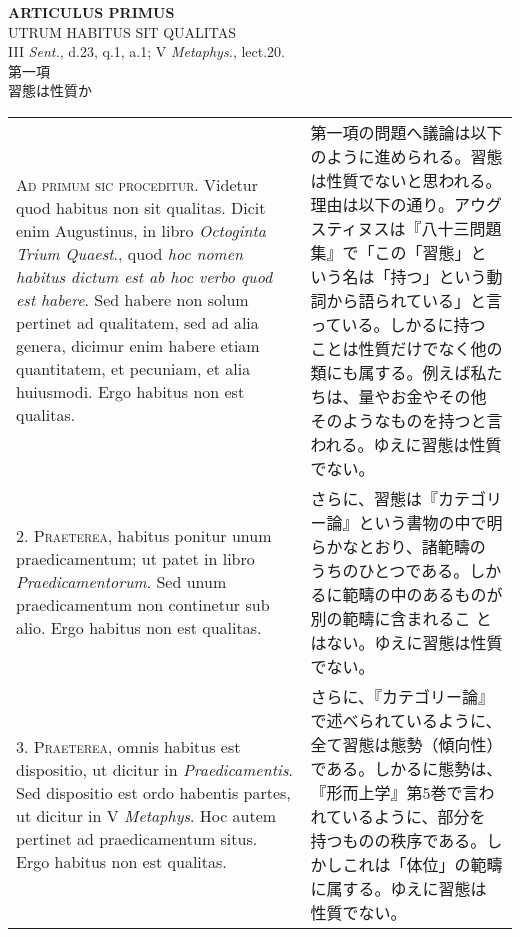\documentclass[10pt]{jsarticle} %
\begin{document}
\newpage
{}
\begin{center}
{\Large {\bf ARTICULUS PRIMUS}}\\
{\large UTRUM HABITUS SIT QUALITAS}\\
{\footnotesize III {\itshape Sent.}, d.23, q.1, a.1; V {\itshape
 Metaphys.}, lect.20.}\\
{\Large 第一項\\習態は性質か}
\end{center}

\begin{longtable}{p{21em}p{21em}}

{\scshape Ad primum sic proceditur}. Videtur quod habitus non sit
qualitas. Dicit enim Augustinus, in libro {\itshape Octoginta Trium Quaest}.,
quod {\itshape hoc nomen habitus dictum est ab hoc verbo quod est habere}. Sed
habere non solum pertinet ad qualitatem, sed ad alia genera, dicimur
enim habere etiam quantitatem, et pecuniam, et alia huiusmodi. Ergo
habitus non est qualitas.

&

第一項の問題へ議論は以下のように進められる。習態は性質でないと思われる。
理由は以下の通り。アウグスティヌスは『八十三問題集』で「この「習態」と
いう名は「持つ」という動詞から語られている」と言っている。しかるに持つ
ことは性質だけでなく他の類にも属する。例えば私たちは、量やお金やその他
そのようなものを持つと言われる。ゆえに習態は性質でない。

\\



2. {\scshape Praeterea}, habitus ponitur unum praedicamentum; ut patet in libro
{\itshape Praedicamentorum}. Sed unum praedicamentum non continetur sub
alio. Ergo habitus non est qualitas.

&

さらに、習態は『カテゴリー論』という書物の中で明らかなとおり、諸範疇の
 うちのひとつである。しかるに範疇の中のあるものが別の範疇に含まれるこ
 とはない。ゆえに習態は性質でない。

\\



3. {\scshape Praeterea}, omnis habitus est dispositio, ut dicitur in
{\itshape Praedicamentis}. Sed dispositio est ordo habentis partes, ut dicitur in
V {\itshape Metaphys}. Hoc autem pertinet ad praedicamentum situs. Ergo habitus
non est qualitas.

&

さらに、『カテゴリー論』で述べられているように、全て習態は態勢（傾向性）
である。しかるに態勢は、『形而上学』第5巻で言われているように、部分を
持つものの秩序である。しかしこれは「体位」の範疇に属する。ゆえに習態は
 性質でない。



\end{longtable}
\end{document}
